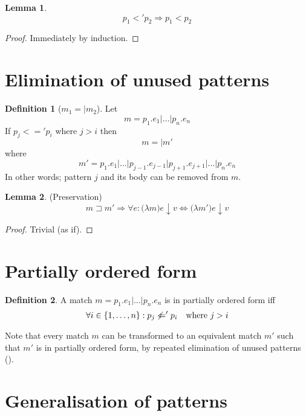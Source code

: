 \documentclass[a4paper, oneside, draft]{memoir}
\let\fref\undefined
\theoremstyle{definition}
\newtheorem{definition}{Definition}
\newtheorem{lemma}{Lemma}
\begin{document}
\begin{lemma}\label{part-imp-tot}
  \[
  p_1 <' p_2 \Rightarrow p_1 < p_2
  \]
\end{lemma}
\begin{proof}
  Immediately by induction.
\end{proof}

\section{Elimination of unused patterns}\label{sec:elim-unus-patt}
\begin{definition}[$m_1 =| m_2$]
  Let
  \[
  m = p_1\texttt{.}e_1 \texttt{|} \ldots \texttt{|} p_n\texttt{.}e_n
  \]
  If $p_j <=' p_i$ where $j > i$ then 
  \[
  m =| m'
  \]
  where
  \[
  m' = p_1\texttt{.}e_1 \texttt{|} \ldots \texttt{|}
  p_{j-1}\texttt{.}e_{j-1} \texttt{|} p_{j+1}\texttt{.}e_{j+1} \texttt{|}
  \ldots \texttt{|} p_n\texttt{.}e_n
  \]
  In other words; pattern $j$ and its body can be removed from $m$.
\end{definition}

\begin{lemma}(Preservation)
  \[
  m \sqsupset m' \Rightarrow \forall e : \texttt{(}\lambda m\texttt{)}e \downarrow
  v \Leftrightarrow \texttt{(}\lambda m'\texttt{)}e \downarrow v
  \]
\end{lemma}
\begin{proof}
  Trivial (as if).
\end{proof}

\section{Partially ordered form}
\begin{definition}
  A match $m = p_1\texttt{.}e_1\texttt{|}\ldots\texttt{|}p_n\texttt{.}e_n$ is in
  partially ordered form iff
  \[
  \forall i \in \{1, \ldots, n\} : p_j \not <=' p_i \quad \textnormal{where $j > i$}
  \]

  Note that every match $m$ can be transformed to an equivalent match $m'$ such
  that $m'$ is in partially ordered form, by repeated elimination of unused
  patterns (\fref{sec:elim-unus-patt}).
\end{definition}

\section{Generalisation of patterns}
\end{document}
